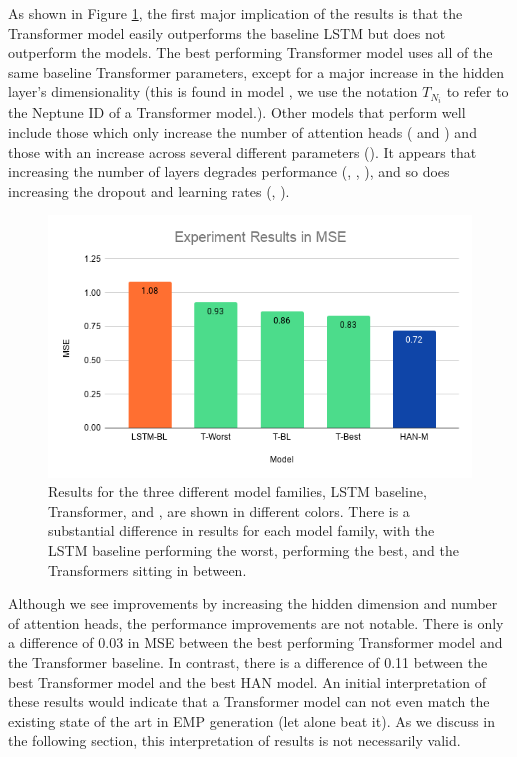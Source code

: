 As shown in Figure \ref{fig:experiment_results}, the first major implication of the results is that the Transformer model easily outperforms the baseline LSTM but does not outperform the \vnet{} models. The best performing Transformer model uses all of the same baseline Transformer parameters, except for a major increase in the hidden layer's dimensionality (this is found in model , we use the notation $T_{N_{i}}$ to refer to the Neptune ID of a Transformer model.). Other models that perform well include those which only increase the number of attention heads ( and ) and those with an increase across several different parameters (). It appears that increasing the number of layers degrades performance (, , ), and so does increasing the dropout and learning rates (, ). 

\begin{figure}[!b]
    \centering
    \includegraphics[width=0.8\linewidth]{figs/ch5/experiment_results.png}
    \caption{Results for the three different model families, LSTM baseline, Transformer, and \vnet{}, are shown in different colors. There is a substantial difference in results for each model family, with the LSTM baseline performing the worst, \vnet{} performing the best, and the Transformers sitting in between.}
    \label{fig:experiment_results}
\end{figure}

Although we see improvements by increasing the hidden dimension and number of attention heads, the performance improvements are not notable. There is only a difference of 0.03 in MSE between the best performing Transformer model and the Transformer baseline. In contrast, there is a difference of 0.11 between the best Transformer model and the best HAN model. An initial interpretation of these results would indicate that a Transformer model can not even match the existing state of the art in EMP generation (let alone beat it). As we discuss in the following section, this interpretation of results is not necessarily valid. 